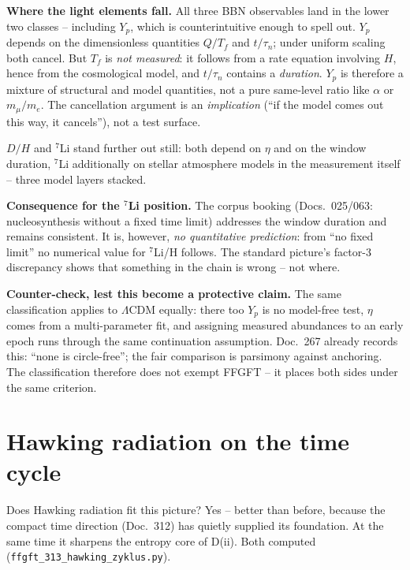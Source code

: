\documentclass[11pt]{report}
\begin{document}
\textbf{Where the light elements fall.} All three BBN observables
land in the lower two classes -- including $Y_p$, which is
counterintuitive enough to spell out. $Y_p$ depends on the
dimensionless quantities $Q/T_f$ and $t/\tau_n$; under uniform
scaling both cancel. But $T_f$ is \emph{not measured}: it follows
from a rate equation involving $H$, hence from the cosmological
model, and $t/\tau_n$ contains a \emph{duration}. $Y_p$ is
therefore a mixture of structural and model quantities, not a
pure same-level ratio like $\alpha$ or $m_\mu/m_e$. The
cancellation argument is an \emph{implication}
(\enquote{if the model comes out this way, it cancels}), not a
test surface.

$D/H$ and ${}^7$Li stand further out still: both depend on $\eta$
and on the window duration, ${}^7$Li additionally on stellar
atmosphere models in the measurement itself -- three model layers
stacked.

\textbf{Consequence for the ${}^7$Li position.} The corpus
booking (Docs.~025/063: nucleosynthesis without a fixed time
limit) addresses the window duration and remains consistent. It
is, however, \emph{no quantitative prediction}: from \enquote{no
fixed limit} no numerical value for ${}^7$Li/H follows. The
standard picture's factor-3 discrepancy shows that something in
the chain is wrong -- not where.

\textbf{Counter-check, lest this become a protective claim.} The
same classification applies to $\Lambda$CDM equally: there too
$Y_p$ is no model-free test, $\eta$ comes from a multi-parameter
fit, and assigning measured abundances to an early epoch runs
through the same continuation assumption. Doc.~267 already
records this: \enquote{none is circle-free}; the fair comparison
is parsimony against anchoring. The classification therefore does
not exempt FFGFT -- it places both sides under the same
criterion.

\chapter{Hawking radiation on the time cycle}

Does Hawking radiation fit this picture? Yes -- better than
before, because the compact time direction (Doc.~312) has quietly
supplied its foundation. At the same time it sharpens the entropy
core of D(ii). Both computed
(\texttt{ffgft\_313\_hawking\_zyklus.py}).
\end{document}
